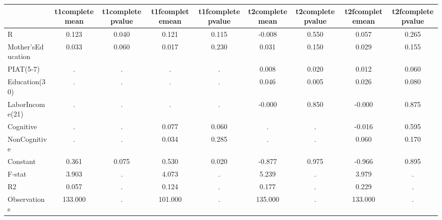 \begin{table}[htbp]
\begin{tabular}{lcccccccc} \hline \hline
 & t1completemean  & t1completepvalue  & t1fcompletemean  & t1fcompletepvalue  & t2completemean  & t2completepvalue  & t2fcompletemean  & t2fcompletepvalue  \\  \hline 
R &     0.123 &     0.040 &     0.121 &     0.115 &    -0.008 &     0.550 &     0.057 &     0.265 \\  
Mother'sEducation &     0.033 &     0.060 &     0.017 &     0.230 &     0.031 &     0.150 &     0.029 &     0.155 \\  
PIAT(5-7) &         . &         . &         . &         . &     0.008 &     0.020 &     0.012 &     0.060 \\  
Education(30) &         . &         . &         . &         . &     0.046 &     0.005 &     0.026 &     0.080 \\  
LaborIncome(21) &         . &         . &         . &         . &    -0.000 &     0.850 &    -0.000 &     0.875 \\  
Cognitive &         . &         . &     0.077 &     0.060 &         . &         . &    -0.016 &     0.595 \\  
NonCognitive &         . &         . &     0.034 &     0.285 &         . &         . &     0.060 &     0.170 \\  
Constant &     0.361 &     0.075 &     0.530 &     0.020 &    -0.877 &     0.975 &    -0.966 &     0.895 \\  
F-stat &     3.903 &         . &     4.073 &         . &     5.239 &         . &     3.979 &         . \\  
R2 &     0.057 &         . &     0.124 &         . &     0.177 &         . &     0.229 &         . \\  
Observations &   133.000 &         . &   101.000 &         . &   135.000 &         . &   133.000 &         . \\  
\hline \hline \end{tabular}
\end{table}
